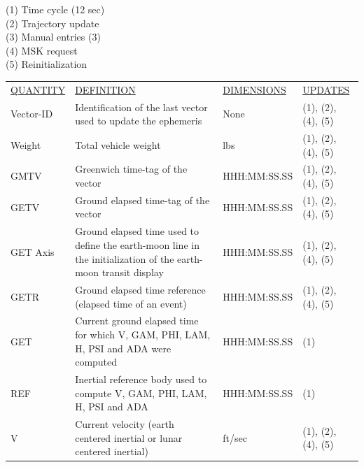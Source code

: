 \documentclass[11pt]{article} %
\begin{document}
(1) Time cycle (12 sec)\\
(2) Trajectory update\\
(3) Manual entries (3)\\
(4) MSK request\\
(5) Reinitialization\\
\begin{center}
\begin{tabular}{ L{2.4cm} L{5.1cm} L{3cm} L{3.8cm} }
\underline{QUANTITY} & \underline{DEFINITION} & \underline{DIMENSIONS} & \underline{UPDATES} \\
Vector-ID & Identification of the last vector used to update the ephemeris & None &(1), (2), (4), (5)\\
Weight & Total vehicle weight & lbs & (1), (2), (4), (5)\\
GMTV & Greenwich time-tag of the vector & HHH:MM:SS.SS &(1), (2), (4), (5)\\
GETV & Ground elapsed time-tag of the vector & HHH:MM:SS.SS &(1), (2), (4), (5)\\
GET Axis & Ground elapsed time used to define the earth-moon line in the initialization of the earth-moon transit display&HHH:MM:SS.SS &(1), (2), (4), (5)\\
GETR & Ground elapsed time reference (elapsed time of an event) &HHH:MM:SS.SS &(1), (2), (4), (5)\\
GET & Current ground elapsed time for which V, GAM, PHI, LAM, H, PSI and ADA were computed&HHH:MM:SS.SS &(1)\\
REF & Inertial reference body used to compute V, GAM, PHI, LAM, H, PSI and ADA&HHH:MM:SS.SS &(1)\\
V & Current velocity (earth centered inertial or lunar centered inertial) & ft/sec &(1), (2), (4), (5)\\
\end{tabular}
\end{center}
\end{document}
